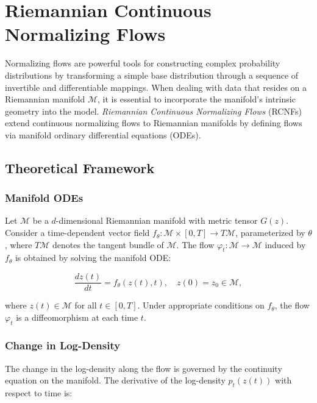 \documentclass[a4paper,14pt]{article}
\renewcommand{\phi}{\ensuremath{\varphi}}
\theoremstyle{plain} %
\theoremstyle{definition} %
\theoremstyle{remark} %
\begin{document}
	\section{Riemannian Continuous Normalizing Flows}
	
	Normalizing flows are powerful tools for constructing complex probability distributions by transforming a simple base distribution through a sequence of invertible and differentiable mappings. When dealing with data that resides on a Riemannian manifold \(\mathcal{M}\), it is essential to incorporate the manifold's intrinsic geometry into the model. \textit{Riemannian Continuous Normalizing Flows} (RCNFs) extend continuous normalizing flows to Riemannian manifolds by defining flows via manifold ordinary differential equations (ODEs).
	
	\subsection{Theoretical Framework}
	
	\subsubsection{Manifold ODEs}
	
	Let \(\mathcal{M}\) be a \(d\)-dimensional Riemannian manifold with metric tensor \(G(z)\). Consider a time-dependent vector field \(f_\theta: \mathcal{M} \times [0, T] \rightarrow T\mathcal{M}\), parameterized by \(\theta\), where \(T\mathcal{M}\) denotes the tangent bundle of \(\mathcal{M}\). The flow \(\phi_t: \mathcal{M} \rightarrow \mathcal{M}\) induced by \(f_\theta\) is obtained by solving the manifold ODE:
	
	\begin{equation}
		\frac{dz(t)}{dt} = f_\theta(z(t), t), \quad z(0) = z_0 \in \mathcal{M},
	\end{equation}
	
	where \(z(t) \in \mathcal{M}\) for all \(t \in [0, T]\). Under appropriate conditions on \(f_\theta\), the flow \(\phi_t\) is a diffeomorphism at each time \(t\).
	
	\subsubsection{Change in Log-Density}
	
	The change in the log-density along the flow is governed by the continuity equation on the manifold. The derivative of the log-density \(p_t(z(t))\) with respect to time is:
	
\end{document}
